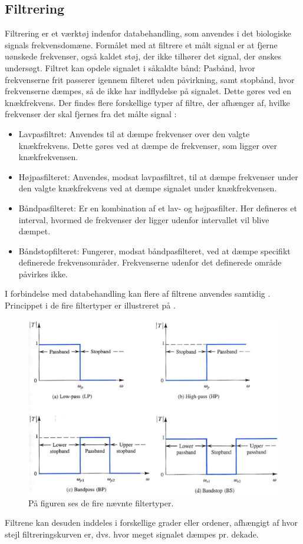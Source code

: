 \subsection{Filtrering}\label{Filterafsnit}
Filtrering er et værktøj indenfor databehandling, som anvendes i det biologiske signals frekvensdomæne. Formålet med at filtrere et målt signal er at fjerne uønskede frekvenser, også kaldet støj, der ikke tilhører det signal, der ønskes undersøgt. Filtret kan opdele signalet i såkaldte bånd: Pasbånd, hvor frekvenserne frit passerer igennem filteret uden påvirkning, samt stopbånd, hvor frekvenserne dæmpes, så de ikke har indflydelse på signalet. Dette gøres ved en knækfrekvens.
Der findes flere forskellige typer af filtre, der afhænger af, hvilke frekvenser der skal fjernes fra det målte signal \cite{Devasahayam2000}:

\begin{itemize}
	\item Lavpasfiltret: Anvendes til at dæmpe frekvenser over den valgte knækfrekvens. Dette gøres ved at dæmpe de frekvenser, som ligger over knækfrekvensen.
	\item Højpasfilteret: Anvendes, modsat lavpasfiltret, til at dæmpe frekvenser under den valgte knækfrekvens ved at dæmpe signalet under knækfrekvensen.
	\item Båndpasfilteret: Er en kombination af et lav- og højpasfilter.  Her defineres et interval, hvormed de frekvenser der ligger udenfor intervallet vil blive dæmpet.
	\item Båndstopfilteret: Fungerer, modsat båndpasfilteret, ved at dæmpe specifikt definerede frekvensområder. Frekvenserne udenfor det definerede område påvirkes ikke. 
\end{itemize}
  
I forbindelse med databehandling kan flere af filtrene anvendes samtidig \cite{Devasahayam2000}. Princippet i de fire filtertyper er illustreret på .
\begin{figure}[H]
\centering
\includegraphics[scale=0.5]{figures/bproblemanalyse/filtertyper2.png}
\caption{På figuren ses de fire nævnte filtertyper. \cite{Sedra2010}}
\label{filtertyper}
\end{figure}
Filtrene kan desuden inddeles i forskellige grader eller ordener, afhængigt af hvor stejl filtreringskurven er, dvs. hvor meget signalet dæmpes pr. dekade\cite{Sedra2010}.

